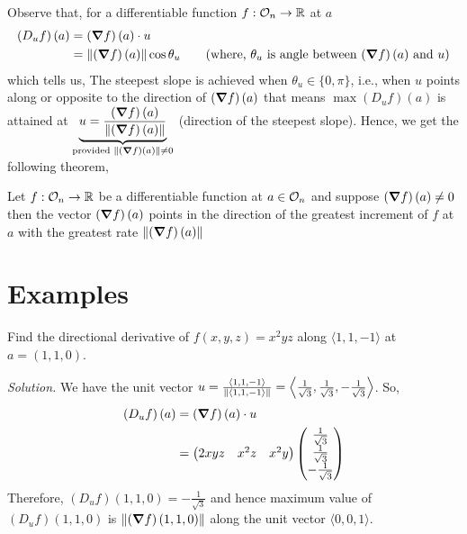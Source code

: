 \documentclass[../Analysis-3.tex]{subfiles}
\begin{document}
Observe that, for a differentiable function $ f: \mathcal{O}_{n} \to \mathbb{R} $ at $ a $
\begin{align*}
  \left( D_uf \right)\left( a \right)
   & = \left( \grad f\right)\left( a \right)\cdot u                                                                                                        \\
   & = \norm{\left( \grad f\right)\left( a \right)}\cos{\theta_u} \tag{where, $\theta_u$ is angle between $\left( \grad f\right)\left( a \right)$ and $u$}
\end{align*}
which tells us, The steepest slope is achieved when $ \theta_u \in \{0, \pi\} $, i.e., when $ u $ points along or opposite to the direction of $ \left( \grad f\right)\left( a \right) $
that means $ \max \left( D_uf \right)\left( a \right) $ is attained at $ \underbrace{u = \frac{\left( \grad f\right)\left( a \right)}{\norm{\left( \grad f\right)\left( a \right)}}}_{\text{provided } \norm{\left( \grad f\right)\left( a \right)} \not=0 } $ (direction of the steepest slope).
Hence, we get the following theorem,
\begin{Thm}{}{}
  Let $ f: \mathcal{O}_{n} \to \mathbb{R} $ be a differentiable function at $ a \in \mathcal{O}_{n} $ and suppose $ \left( \grad f\right)\left( a \right) \not= 0 $ then the vector $\left( \grad f\right)\left( a \right)$ points in the direction of the greatest increment of $ f $ at $ a $ with the greatest rate $ \norm{\left( \grad f\right)\left( a \right)} $
\end{Thm}

\section{Examples}

\begin{Eg}{}{}
  Find the directional derivative of $ f(x,y,z) = x^2yz $ along $ \langle 1,1,-1 \rangle $ at $ a = (1,1,0) $.

  \textit{Solution.} We have the unit vector $ u = \frac{\langle 1,1,-1 \rangle}{\norm{\langle 1,1,-1 \rangle}} = \left\langle \frac{1}{\sqrt{3}}, \frac{1}{\sqrt{3}}, -\frac{1}{\sqrt{3}} \right\rangle $. So,
  \begin{align*}
    \left( D_uf \right)\left( a \right)
     & = \left( \grad f\right)\left( a \right)\cdot u                                                                                       \\
     & = \begin{pmatrix} 2xyz & x^2z & x^2y \end{pmatrix}
    \begin{pmatrix} \frac{1}{\sqrt{3}} \\ \frac{1}{\sqrt{3}} \\ -\frac{1}{\sqrt{3}} \end{pmatrix} \\
  \end{align*}
  Therefore, $ \left( D_uf \right)(1,1,0) = -\frac{1}{\sqrt{3}} $ and hence maximum value of $ \left( D_uf \right)(1,1,0) $ is $ \norm{\left( \grad f\right)(1,1,0)} $ along the unit vector $ \langle 0,0,1 \rangle $.
\end{Eg}
\end{document}
